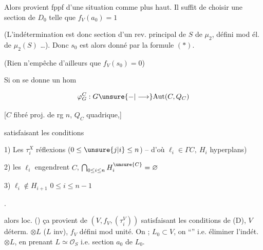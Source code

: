 
Alors  provient  fppf d'une situation comme plus haut. Il suffit de choisir une section  de $D_0$ telle que $f_V(a_0)=1$

(L'indétermination est donc section d'un rev. principal de $S$ de  $\mu_2$, défini mod él. de $\mu_2(S)$ \ldots). Donc $s_0$ est alors donné par la formule $(*)$.

(Rien n'empêche d'ailleurs que $f_V(s_0)=0$)


Si on se donne un hom

\[
\varphi_G^C:G\unsure{-|\longrightarrow}\mathrm{Aut}(C,Q_C)
\]

[$C$ fibré proj. de rg $n$, $Q_C$ quadrique,]

satisfaisant les conditions

1) Les $\tau_i^X$ réflexions  \qquad ($0\le\unsure{j|i}\le n$) -- d'où $\ell_i\in\Gamma C,\ H_i$ hyperplans)

2) les $\ell_i$ engendrent $C$,  $\bigcap_{0\le i\le n}H_i^{\unsure{C}}=\varnothing$

3)  $\ell_i\notin H_{i+1}$ \qquad $0\le i\le n-1$

.

\margin{Pour $n\ge2$ (si $n=1$, une réflexion de la droite \unsure{pr.} $C=\mathrm P(V)$ ne se remonte pas de \uline{façon univoque} en une réfl. de $V$ \ldots]}

alors loc. () ça provient de $(V,f_V,(\tau_i^V))$ satisfaisant les conditions de (D), $V$ déterm.  $\otimes L$ ($L$ inv), $f_V$ défini mod unité. On   ; $L_0\subset V$, on  ``'' i.e. éliminer l'indét. $\otimes L$, en prenant $L\simeq\mathcal O_S$ i.e. section $a_0$ de $L_0$.


